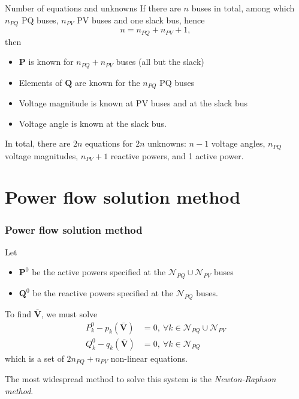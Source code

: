 \begin{frame}[allowframebreaks]{Number of equations and unknowns}
    If there are $n$ buses in total, among which $n_{PQ}$ PQ buses, $n_{PV}$ PV buses and one slack bus, hence
    $$ n = n_{PQ} + n_{PV} + 1,$$
    then
    \begin{itemize}
        \item $\mathbf{P}$ is known for $n_{PQ} + n_{PV}$ buses (all but the slack)
        \item Elements of $\mathbf{Q}$ are known for the $n_{PQ}$ PQ buses
        \item Voltage magnitude is known at PV buses and at the slack bus
        \item Voltage angle is known at the slack bus.
    \end{itemize}
    
    \vspace{1cm}
    
    In total, there are $2n$ equations for $2n$ unknowns: $n-1$ voltage angles, $n_{PQ}$ voltage magnitudes, $n_{PV} + 1$ reactive powers, and 1 active power.
\end{frame}

\section{Power flow solution method}

\begin{frame}
    \frametitle{Power flow solution method}
    Let
    \begin{itemize}
        \item $\mathbf{P}^0$ be the active powers specified at the $\mathcal{N}_{PQ} \cup \mathcal{N}_{PV}$ buses
        \item $\mathbf{Q}^0$ be the reactive powers specified at the $\mathcal{N}_{PQ}$ buses.
    \end{itemize}
    
    To find $\mathbf{\bar{V}}$, we must solve
    \begin{align*}
        P_k^0 - p_k(\mathbf{\bar{V}}) &= 0, \ \forall k \in \mathcal{N}_{PQ} \cup \mathcal{N}_{PV} \\
        Q_k^0 - q_k(\mathbf{\bar{V}}) &= 0, \ \forall k \in \mathcal{N}_{PQ}
    \end{align*}
    which is a set of $2 n_{PQ} + n_{PV}$ non-linear equations.
    
    The most widespread method to solve this system is the \textit{Newton-Raphson method}.
\end{frame}

